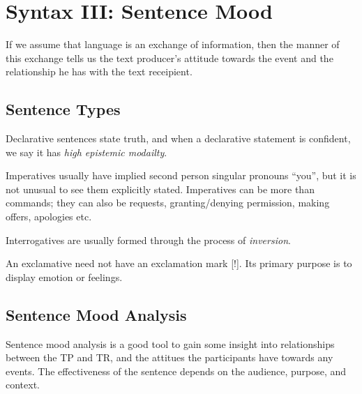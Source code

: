 \documentclass[../main.tex]{subfiles}
\begin{document}
	\section{Syntax III: Sentence Mood}
	\begin{preamb}
		If we assume that language is an exchange of information, then the manner of this exchange tells us the text producer's attitude towards the event and the relationship he has with the text receipient.
	\end{preamb}
	
	\subsection{Sentence Types}
		Declarative sentences state truth, and when a declarative statement is confident, we say it has \textit{high epistemic modailty}.

		Imperatives usually have implied second person singular pronouns ``you'', but it is not unusual to see them explicitly stated.
		Imperatives can be more than commands; they can also be requests, granting/denying permission, making offers, apologies etc. 

		Interrogatives are usually formed through the process of \textit{inversion}.

		An exclamative need not have an exclamation mark [!]. Its primary purpose is to display emotion or feelings.

	\subsection{Sentence Mood Analysis}
	Sentence mood analysis is a good tool to gain some insight into relationships between the TP and TR, and the attitues the participants have towards any events. The effectiveness of the sentence depends on the audience, purpose, and context.
	
\end{document}
